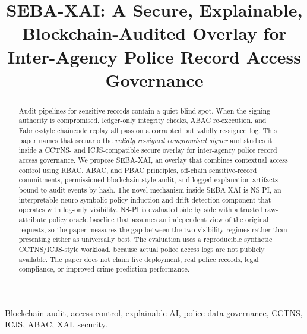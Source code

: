 \documentclass[conference]{IEEEtran}
\begin{document}
\title{SEBA-XAI: A Secure, Explainable, Blockchain-Audited Overlay for Inter-Agency Police Record Access Governance}

\author{
}

\maketitle

\begin{abstract}
Audit pipelines for sensitive records contain a quiet blind spot. When
the signing authority is compromised, ledger-only integrity checks,
ABAC re-execution, and Fabric-style chaincode replay all pass on a
corrupted but validly re-signed log. This paper names that scenario the
\emph{validly re-signed compromised signer} and studies it inside a
CCTNS- and ICJS-compatible secure overlay for inter-agency police
record access governance. We propose SEBA-XAI, an overlay that combines
contextual access control using RBAC, ABAC, and PBAC principles,
off-chain sensitive-record commitments, permissioned blockchain-style
audit, and logged explanation artifacts bound to audit events by hash.
The novel mechanism inside SEBA-XAI is NS-PI, an interpretable
neuro-symbolic policy-induction and drift-detection component that
operates with log-only visibility. NS-PI is evaluated side by side with
a trusted raw-attribute policy oracle baseline that assumes an
independent view of the original requests, so the paper measures the
gap between the two visibility regimes rather than presenting either as
universally best. The evaluation uses a reproducible synthetic
CCTNS/ICJS-style workload, because actual police access logs are not
publicly available. The paper does not claim live deployment, real
police records, legal compliance, or improved crime-prediction
performance.
\end{abstract}

\begin{IEEEkeywords}
Blockchain audit, access control, explainable AI, police data governance, CCTNS, ICJS, ABAC, XAI, security.
\end{IEEEkeywords}


\end{document}
